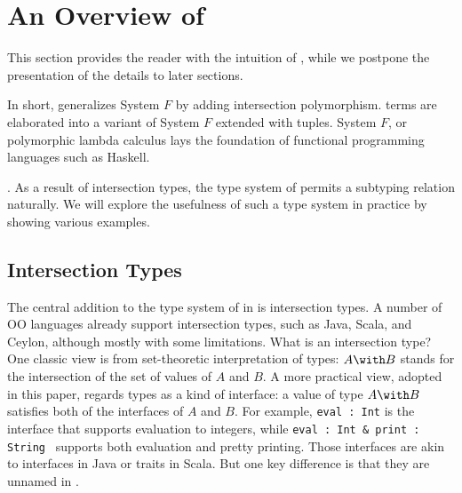 \section{An Overview of \name}


This section provides the reader with the intuition of \name, while we
postpone the presentation of the details to later sections.

In short, \name generalizes System $ F $ by adding intersection polymorphism.
\name terms are elaborated into a variant of System $ F $ extended with tuples.
System $ F $, or polymorphic lambda calculus lays the foundation of functional
programming languages such as Haskell.

. As a result of intersection
types, the type system of \name permits a subtyping relation naturally. We will
explore the usefulness of such a type system in practice by showing various
examples.

\subsection{Intersection Types}

The central addition to the type system of \target in \name is intersection
types.  A number of OO languages already support
intersection types, such as Java, Scala, and Ceylon, although mostly with some
limitations. What is an intersection type? One classic view is from
set-theoretic interpretation of types: $ A \intersects B $ stands for the
intersection of the set of values of $ A $ and $ B $. A more practical view,
adopted in this paper, regards types as a kind of interface: a value of type
$ A \intersects B $ satisfies both of the interfaces of $ A $ and $ B $. For
example, \lstinline{eval : Int} is the interface that supports evaluation to
integers, while \lstinline{eval : Int & print : String } supports both
evaluation and pretty printing. Those interfaces are akin to interfaces in Java
or traits in Scala. But one key difference is that they are unnamed in \name.

